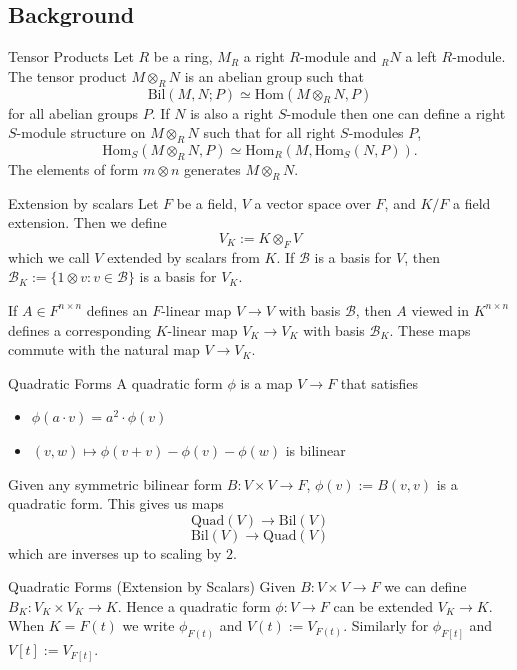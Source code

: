 \documentclass[svgnames]{beamer}
\begin{document}
\subsection{Background}
\begin{frame}{Tensor Products}
Let $R$ be a ring, $M_R$ a right $R$-module and $_RN$ a left $R$-module. The tensor product $M \otimes_R N$ is an abelian group such that 
\[\text{Bil}(M,N; P) \simeq \text{Hom}(M \otimes_R N, P)\]
for all abelian groups $P$. If $N$ is also a right $S$-module then one can define a right $S$-module structure on $M \otimes_R N$ such that for all right $S$-modules $P$, 
\[\text{Hom}_S(M \otimes_R N, P) \simeq \text{Hom}_R(M, \text{Hom}_S(N,P)). \]
The elements of form $m \otimes n$ generates $M \otimes_R N$.
\end{frame}
\begin{frame}{Extension by scalars}
Let $F$ be a field, $V$ a vector space over $F$, and $K/F$ a field extension. Then we define
\[V_K := K \otimes_F V\]
which we call $V$ extended by scalars from $K$. If $\mathcal B$ is a basis for $V$, then $\mathcal B_K:=\{1 \otimes v:v \in \mathcal B\}$ is a basis for $V_K$.

\pause If $A \in F^{n \times n}$ defines an $F$-linear map $V \to V$ with basis $\mathcal B$, then $A$ viewed in $K^{n \times n}$ defines a corresponding $K$-linear map $V_K \to V_K$ with basis $\mathcal B_K$. These maps commute with the natural map $V \to V_K$. 
\end{frame}
\begin{frame}{Quadratic Forms}
A quadratic form $\phi$ is a map $V \to F$ that satisfies
\begin{itemize}
    \item $\phi(a\cdot v)=a^2 \cdot \phi(v)$
    \item $(v,w) \mapsto \phi(v+v)-\phi(v)-\phi(w)$ is bilinear
\end{itemize}
Given any symmetric bilinear form $B: V \times V \to F$, $\phi(v) := B(v,v)$ is a quadratic form. 
\pause This gives us maps 
\[\text{Quad}(V) \to \text{Bil}(V)\]
\[\text{Bil}(V) \to \text{Quad}(V)\]
which are inverses up to scaling by $2$. 
\end{frame}
\begin{frame}{Quadratic Forms (Extension by Scalars)}
Given $B: V \times V \to F$ we can define $B_K: V_K \times V_K \to K$. Hence a quadratic form $\phi: V \to F$ can be extended $V_K \to K$. \\

When $K=F(t)$ we write $\phi_{F(t)}$ and $V(t) := V_{F(t)}$. Similarly for $\phi_{F[t]}$ and $V[t] := V_{F[t]}$. 
\end{frame}
\end{document}
